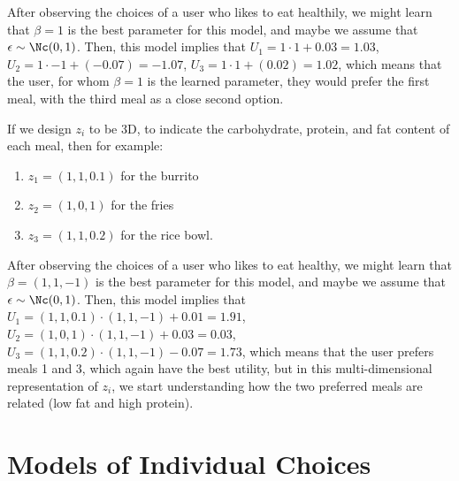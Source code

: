 \documentclass[
  letterpaper,
  DIV=11,
  numbers=noendperiod,
  oneside]{scrreprt}
\theoremstyle{remark}
\begin{document}
After observing the choices of a user who likes to eat healthily, we
might learn that \(\beta = 1\) is the best parameter for this model, and
maybe we assume that \(\epsilon \sim \Nc(0, 1)\). Then, this model
implies that \(U_1 = 1 \cdot 1 + 0.03 = 1.03\),
\(U_2 = 1 \cdot -1 + (-0.07) = -1.07\),
\(U_3 = 1 \cdot 1 + (0.02) = 1.02\), which means that the user, for whom
\(\beta = 1\) is the learned parameter, they would prefer the first
meal, with the third meal as a close second option.

If we design \(z_i\) to be 3D, to indicate the carbohydrate, protein,
and fat content of each meal, then for example:

\begin{enumerate}
\def\labelenumi{\arabic{enumi}.}
\item
  \(z_1 = (1, 1, 0.1)\) for the burrito
\item
  \(z_2 = (1, 0, 1)\) for the fries
\item
  \(z_3 = (1, 1, 0.2)\) for the rice bowl.
\end{enumerate}

After observing the choices of a user who likes to eat healthy, we might
learn that \(\beta = (1, 1, -1)\) is the best parameter for this model,
and maybe we assume that \(\epsilon \sim \Nc(0, 1)\). Then, this model
implies that \(U_1 = (1, 1, 0.1) \cdot (1, 1, -1) + 0.01 = 1.91\),
\(U_2 = (1, 0, 1) \cdot (1, 1, -1) + 0.03 = 0.03\),
\(U_3 = (1, 1, 0.2) \cdot (1, 1, -1) - 0.07 = 1.73\), which means that
the user prefers meals 1 and 3, which again have the best utility, but
in this multi-dimensional representation of \(z_i\), we start
understanding how the two preferred meals are related (low fat and high
protein).

\section{Models of Individual Choices}\label{sec:models}
\end{document}

